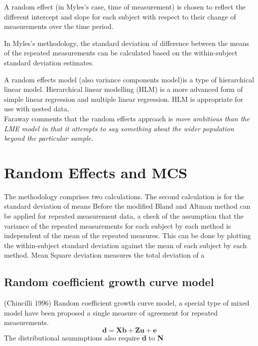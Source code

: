 \documentclass[MAIN.tex]{subfiles}
\begin{document}
A random effect (in Myles's case, time of measurement) is chosen
to reflect the different intercept and slope for each subject with
respect to their change of measurements over the time period.

In Myles's methodology, the standard deviation of difference
between the means of the repeated measurements can be calculated
based on the within-subject standard deviation estimates.

A random effects model (also variance components model)is a type
of hierarchical linear model. Hierarchical linear modelling (HLM)
is a more advanced form of simple linear regression and multiple
linear regression. HLM is appropriate for use with nested
data.\\Faraway comments that the random effects approach is
\emph{more ambitious than the LME model in that it attempts to say
	something about the wider population beyond the particular
	sample}.



\section{Random Effects and MCS}
The methodology comprises two calculations. The second calculation
is for the standard deviation of means Before the modified Bland
and Altman method can be applied for repeated measurement data, a
check of the assumption that the variance of the repeated
measurements for each subject by each method is independent of the
mean of the repeated measures. This can be done by plotting the
within-subject standard deviation against the mean of each subject
by each method. Mean Square deviation measures the total deviation
of a


\subsection{Random coefficient growth curve model} (Chincilli
1996) Random coefficient growth curve model, a special type of
mixed model have been proposed a single measure of agreement for
repeated measurements.
\begin{equation}
\textbf{d}= \textbf{Xb} + \textbf{Zu} + \textbf{e}
\end{equation}
The distributional asummptions also require \textbf{d} to
\textbf{N}
\end{document}
